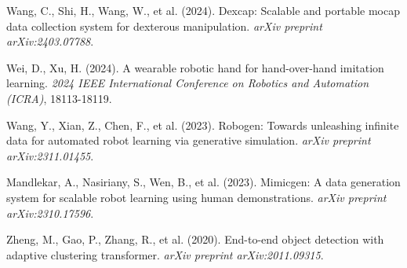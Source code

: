 \documentclass[a4paper]{article}
\begin{document}
\begin{thebibliography}{99}
 Wang, C., Shi, H., Wang, W., et al. (2024). Dexcap: Scalable and portable mocap data collection system for dexterous manipulation. \textit{arXiv preprint arXiv:2403.07788}.

 Wei, D., Xu, H. (2024). A wearable robotic hand for hand-over-hand imitation learning. \textit{2024 IEEE International Conference on Robotics and Automation (ICRA)}, 18113-18119.

 Wang, Y., Xian, Z., Chen, F., et al. (2023). Robogen: Towards unleashing infinite data for automated robot learning via generative simulation. \textit{arXiv preprint arXiv:2311.01455}.

 Mandlekar, A., Nasiriany, S., Wen, B., et al. (2023). Mimicgen: A data generation system for scalable robot learning using human demonstrations. \textit{arXiv preprint arXiv:2310.17596}.

 Zheng, M., Gao, P., Zhang, R., et al. (2020). End-to-end object detection with adaptive clustering transformer. \textit{arXiv preprint arXiv:2011.09315}.
\end{thebibliography}
\end{document}
